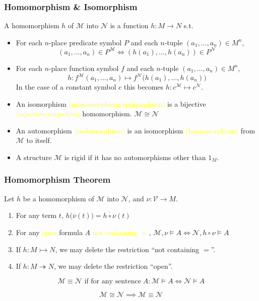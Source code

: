 \documentclass[UTF8,aspectratio=43,11pt,colorlinks,compress,openany]{beamer}%
\begin{document}
\begin{frame}\frametitle{Homomorphism \& Isomorphism}
\setlength\abovedisplayskip{0pt}
\setlength\belowdisplayskip{0pt}
	\begin{definition}[Homomorphism]
		A homomorphism $h$ of $\mathcal{M}$ into $\mathcal{N}$ is a function $h: M\to N$ s.t.
		\begin{itemize}
			\item For each $n$-place predicate symbol $P$ and each $n$-tuple $(a_1,\dots,a_n)\in M^n$,
			\[(a_1,\dots,a_n)\in P^{\mathcal{M}}\iff(h(a_1),\dots,h(a_n))\in P^{\mathcal{N}}\]
			\item For each $n$-place function symbol $f$ and each $n$-tuple $(a_1,\dots,a_n)\in M^n$,
			\[h: f^{\mathcal{M}}(a_1,\dots,a_n)\mapsto f^{\mathcal{N}}\bigl(h(a_1),\dots,h(a_n)\bigr)\]
			In the case of a constant symbol $c$ this becomes $h: c^{\mathcal{M}}\mapsto c^{\mathcal{N}}$.
		\end{itemize}
	\end{definition}
	\begin{itemize}
		\item An isomorphism \textcolor{yellow}{(monomorphism/epimorphism)} is a bijective \textcolor{yellow}{(injective/surjective)} homomorphism. $\mathcal{M}\cong\mathcal{N}$
		\item An automorphism \textcolor{yellow}{(endomorphism)} is an isomorphism \textcolor{yellow}{(homomorphism)} from $\mathcal{M}$ to itself.
		\item A structure $\mathcal{M}$ is rigid if it has no automorphisms other than $1_M$.
	\end{itemize}
\end{frame}

\begin{frame}\frametitle{Homomorphism Theorem}
	\begin{theorem}
		Let $h$ be a homomorphism of $\mathcal{M}$ into $\mathcal{N}$, and $\nu: \mathcal{V}\to M$.
		\begin{enumerate}
			\item For any term $t$, $h\bigl(\overline{\nu}(t)\bigr)=\overline{h\circ\nu}(t)$
			\item For any \textcolor{yellow}{open} formula $A$ \textcolor{yellow}{not containing $=$}, $\mathcal{M},\nu\vDash A\iff\mathcal{N},h\circ\nu\vDash A$
			\item If $h: M\rightarrowtail N$, we may delete the restriction ``not containing $=$''.
			\item If $h: M\twoheadrightarrow N$, we may delete the restriction ``open''.
		\end{enumerate}
	\end{theorem}
	\begin{definition}
		\[\mathcal{M}\equiv\mathcal{N} \text{ if for any sentence}\; A: \mathcal{M}\vDash A\iff\mathcal{N}\vDash A\]
	\end{definition}
	\[\mathcal{M}\cong\mathcal{N}\implies\mathcal{M}\equiv\mathcal{N}\]
\end{frame}
\end{document}
